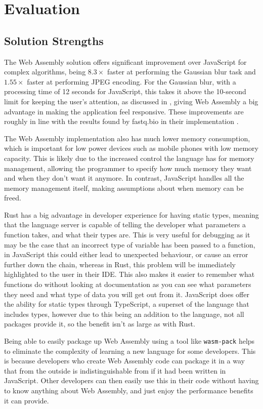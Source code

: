 \documentclass[12pt,a4paper]{article}
\begin{document}
\section{Evaluation}

\subsection{Solution Strengths}

The Web Assembly solution offers significant improvement over JavaScript for complex algorithms, being $8.3 \times$ faster at performing the Gaussian blur task and $1.55 \times$ faster at performing JPEG encoding. For the Gaussian blur, with a processing time of 12 seconds for JavaScript, this takes it above the 10-second limit for keeping the user's attention, as discussed in \cite{nielsen1994usability}, giving Web Assembly a big advantage in making the application feel responsive. These improvements are roughly in line with the results found by fastq.bio in their implementation \cite{fastq}.

The Web Assembly implementation also has much lower memory consumption, which is important for low power devices such as mobile phones with low memory capacity. This is likely due to the increased control the language has for memory management, allowing the programmer to specify how much memory they want and when they don't want it anymore. In contrast, JavaScript handles all the memory management itself, making assumptions about when memory can be freed.

Rust has a big advantage in developer experience for having static types, meaning that the language server is capable of telling the developer what parameters a function takes, and what their types are. This is very useful for debugging as it may be the case that an incorrect type of variable has been passed to a function, in JavaScript this could either lead to unexpected behaviour, or cause an error further down the chain, whereas in Rust, this problem will be immediately highlighted to the user in their IDE. This also makes it easier to remember what functions do without looking at documentation as you can see what parameters they need and what type of data you will get out from it. JavaScript does offer the ability for static types through TypeScript, a superset of the language that includes types, however due to this being an addition to the language, not all packages provide it, so the benefit isn't as large as with Rust.

Being able to easily package up Web Assembly using a tool like \texttt{wasm-pack} helps to eliminate the complexity of learning a new language for some developers. This is because developers who create Web Assembly code can package it in a way that from the outside is indistinguishable from if it had been written in JavaScript. Other developers can then easily use this in their code without having to know anything about Web Assembly, and just enjoy the performance benefits it can provide.
\end{document}
